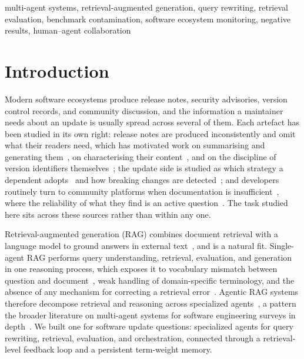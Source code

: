 \documentclass[10pt,conference]{IEEEtran}
\begin{document}
\begin{IEEEkeywords}
multi-agent systems, retrieval-augmented generation, query rewriting, retrieval
evaluation, benchmark contamination, software ecosystem monitoring, negative
results, human--agent collaboration
\end{IEEEkeywords}

\section{Introduction}

Modern software ecosystems produce release notes, security advisories, version
control records, and community discussion, and the information a maintainer
needs about an update is usually spread across several of them. Each artefact
has been studied in its own right: release notes are produced inconsistently and
omit what their readers need, which has motivated work on summarising and
generating them~\cite{abebe2016releasenotes,moreno2017arena,bi2022releasenotes},
on characterising their content~\cite{wu2023releasenotes}, and on the discipline
of version identifiers themselves~\cite{guo2025verlog}; the update side is
studied as which strategy a dependent adopts~\cite{javanjafari2023strategies}
and how breaking changes are detected~\cite{kong2025breaking}; and developers
routinely turn to community platforms when documentation is
insufficient~\cite{xia2017websearch,zhang2018apimisuse}, where the reliability
of what they find is an active question~\cite{kabir2024stackoverflow,stolee2025codesearch}.
The task studied here sits across these sources rather than within any one.

Retrieval-augmented generation (RAG) combines document retrieval with a language
model to ground answers in external text~\cite{lewis2020rag}, and is a natural
fit. Single-agent RAG performs query understanding, retrieval, evaluation, and
generation in one reasoning process, which exposes it to vocabulary mismatch
between question and document~\cite{gao2024dmqr}, weak handling of
domain-specific terminology, and the absence of any mechanism for correcting a
retrieval error~\cite{cook2025rag}. Agentic RAG systems therefore decompose
retrieval and reasoning across specialized agents~\cite{wang2024mainrag,nguyen2025marag},
a pattern the broader literature on multi-agent systems for software engineering
surveys in depth~\cite{he2025,liu2026agentsurvey}. We built one for software
update questions: specialized agents for query rewriting, retrieval, evaluation,
and orchestration, connected through a retrieval-level feedback loop and a
persistent term-weight memory.
\end{document}
